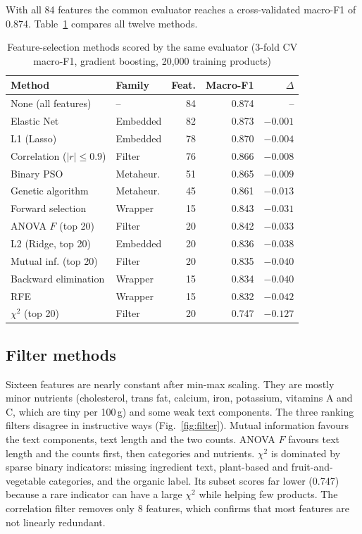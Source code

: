 \documentclass[conference]{IEEEtran}
\begin{document}
With all 84 features the common evaluator reaches a cross-validated macro-F1 of 0.874. Table~\ref{tab:fs} compares all twelve methods.

\begin{table}[t]
\centering
\caption{Feature-selection methods scored by the same evaluator (3-fold CV macro-F1, gradient boosting, 20,000 training products)}
\label{tab:fs}
\begin{tabular}{llrrr}
\toprule
Method & Family & Feat. & Macro-F1 & $\Delta$ \\
\midrule
None (all features) & -- & 84 & 0.874 & -- \\
Elastic Net & Embedded & 82 & 0.873 & $-0.001$ \\
L1 (Lasso) & Embedded & 78 & 0.870 & $-0.004$ \\
Correlation ($|r|\le0.9$) & Filter & 76 & 0.866 & $-0.008$ \\
Binary PSO & Metaheur. & 51 & 0.865 & $-0.009$ \\
Genetic algorithm & Metaheur. & 45 & 0.861 & $-0.013$ \\
Forward selection & Wrapper & 15 & 0.843 & $-0.031$ \\
ANOVA $F$ (top 20) & Filter & 20 & 0.842 & $-0.033$ \\
L2 (Ridge, top 20) & Embedded & 20 & 0.836 & $-0.038$ \\
Mutual inf. (top 20) & Filter & 20 & 0.835 & $-0.040$ \\
Backward elimination & Wrapper & 15 & 0.834 & $-0.040$ \\
RFE & Wrapper & 15 & 0.832 & $-0.042$ \\
$\chi^2$ (top 20) & Filter & 20 & 0.747 & $-0.127$ \\
\bottomrule
\end{tabular}
\end{table}

\subsection{Filter methods}
Sixteen features are nearly constant after min-max scaling. They are mostly minor nutrients (cholesterol, trans fat, calcium, iron, potassium, vitamins A and C, which are tiny per 100\,g) and some weak text components. The three ranking filters disagree in instructive ways (Fig.~\ref{fig:filter}). Mutual information favours the text components, text length and the two counts. ANOVA $F$ favours text length and the counts first, then categories and nutrients. $\chi^2$ is dominated by sparse binary indicators: missing ingredient text, plant-based and fruit-and-vegetable categories, and the organic label. Its subset scores far lower (0.747) because a rare indicator can have a large $\chi^2$ while helping few products. The correlation filter removes only 8 features, which confirms that most features are not linearly redundant.
\end{document}
